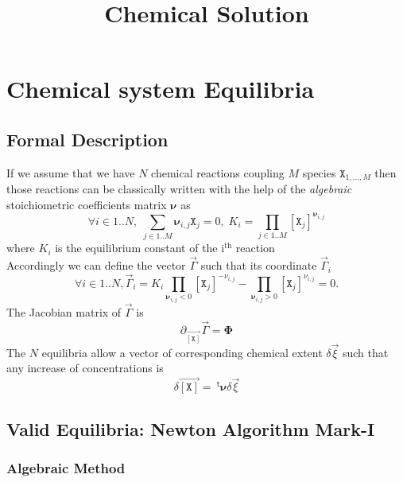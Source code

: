 \documentclass[aps,onecolumn]{revtex4}
\newcommand{\myconc}[1]{\left\lbrack #1 \right\rbrack}
\newcommand{\mychem}[1]{{\mathtt{#1}}}
\newcommand{\species}{\mychem{X}}
\newcommand{\mymat}[1]{\boldsymbol{#1}}
\newcommand{\mytrn}[1]{{\!\!~^{\mathsf{t}}{#1}}}
\newcommand{\myvec}[1]{\overrightarrow{#1}}
\newcommand{\vecX}{\myvec{\myconc{\mychem{X}}}}
\begin{document}
\title{Chemical Solution}


\maketitle

\section{Chemical system Equilibria}
\subsection{Formal Description}
If we assume that we have $N$ chemical reactions coupling $M$ species $\species_{1,\ldots,M}$ then those reactions can be classically written with the help
of the \textit{algebraic} stoichiometric coefficients matrix $\mymat{\nu}$ as
\begin{equation}
	\label{eq:Ki}
	\forall i \in 1..N, \; \sum_{j\in1..M} \mymat{\nu}_{i,j} \species_j = 0, \; K_i=\prod_{j\in1..M} \myconc{\species_j}^{\mymat{\nu}_{i,j}}
\end{equation}
where $K_i$ is the equilibrium constant of the i$^{\text{th}}$ reaction\\
Accordingly we can define the vector $\vec{\Gamma}$ such that its coordinate $\vec{\Gamma}_i$
\begin{equation}
	\label{eq:Gamma}
	\forall i \in 1..N, \vec{\Gamma}_i = K_i \prod_{\mymat{\nu}_{i,j}<0} \myconc{\species_j}^{-\nu_{i,j}} - \prod_{\mymat{\nu}_{i,j}>0} \myconc{\species_j}^{\nu_{i,j}} = 0.
\end{equation}
The Jacobian matrix of $\vec{\Gamma}$ is
\begin{equation}
	\partial_{\vecX} \vec{\Gamma} = \mymat{\Phi}
\end{equation}
The $N$ equilibria allow a vector of corresponding chemical extent $\delta\vec{\xi}$ such that any increase of concentrations is
\begin{equation}
	\delta\vecX = \mytrn{\mymat{\nu}} \delta\vec{\xi}
\end{equation}

\subsection{Valid Equilibria: Newton Algorithm Mark-I}
\subsubsection{Algebraic Method}
\end{document}
